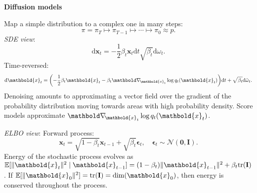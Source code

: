 \documentclass[10pt]{article}
\newenvironment{topic}[1]
{\textbf{\sffamily \footnotesize \colorbox{black}{\rlap{\textbf{\textcolor{white}{#1}}}\hspace{\linewidth}\hspace{-2\fboxsep}}}}
{}
\newenvironment{subtopic}[1]
{\begin{center}\textbf{\footnotesize \sffamily #1}\end{center}}
{}
\renewcommand{\mat}[1]{\ensuremath{\mathbf{#1}}}
\renewcommand{\vec}[1]{\ensuremath{\mathbold{#1}}}
\begin{document}
\begin{multicols*}{3}
\begin{topic}{Generative models}
        \begin{subtopic}{Diffusion models}
            Map a simple distribution to a complex one in many steps: \[
                \pi = \pi_T \mapsto \pi_{T-1} \mapsto \cdots \mapsto \pi_0 \approx p.
            \]
            \textit{SDE view}: \[
                \mathrm{d}\vec{x}_t = -\frac{1}{2} \beta_t \vec{x}_t \mathrm{d}t \sqrt{\beta_t} \mathrm{d}\omega_t.
            \]
            Time-reversed: \[
                \mathrm{d}\vec{x}_t = \lft( -\frac{1}{2} \beta_t \vec{x}_t - \beta_t \grad{\log q_t(\vec{x}_t)}{\vec{x}_t} \rgt) \mathrm{d}t + \sqrt{\beta_t} \mathrm{d}\tilde{\omega}_t.
            \]
            Denoising amounts to approximating a vector field over the gradient of the probability distribution
            moving towards areas with high probability density. Score models approximate $\grad{\log
                    q_t(\vec{x}_t)}{\vec{x}_t}$.

            \textit{ELBO view}: Forward process: \[
                \vec{x}_t = \sqrt{1-\beta_t} \vec{x}_{t-1} + \sqrt{\beta_t} \vec{\epsilon}_t, \quad \vec{\epsilon}_t \sim \mathcal{N}(\vec{0}, \mat{I}).
            \]
            Energy of the stochastic process evolves as $\E[\| \vec{x}_t \|^2 \mid \vec{x}_{t-1}] =
                (1-\beta_t)\| \vec{x}_{t-1} \|^2 + \beta_t \mathrm{tr}(\mat{I})$. If $\E[\| \vec{x}_0 \|^2] =
                \mathrm{tr}(\mat{I}) = \dim(\vec{x}_0)$, then energy is conserved throughout the process.


\end{subtopic}
\end{topic}
\end{multicols*}
\end{document}
